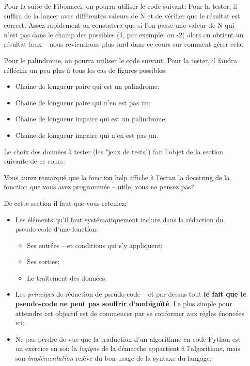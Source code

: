 \documentclass[12pt]{article}
\begin{document}
	\begin{MaReponse}
		Pour la suite de Fibonacci, on pourra utiliser le code suivant:
		Pour la tester, il suffira de la lancer avec différentes valeurs de N et de vérifier que le résultat est correct. Assez rapidement on constatera que si l'on passe une valeur de N qui n'est pas dans le champ des possibles (1, par exemple, ou -2) alors on obtient un résultat faux -- nous reviendrons plus tard dans ce cours sur comment gérer cela.
		\vspace{\baselineskip}
		
		Pour le palindrome, on pourra utiliser le code suivant:
		Pour la tester, il faudra réfléchir un peu plus à tous les cas de figures possibles:
		\begin{itemize}
			\item Chaine de longueur paire qui est un palindrome;
			\item Chaine de longueur paire qui n'en est pas un;
			\item Chaine de longueur impaire qui est un palindrome;
			\item Chaine de longueur impaire qui n'en est pas un.
		\end{itemize}
		
		Le choix des données à tester (les "jeux de tests") fait l'objet de la section suivante de ce cours.
		
		Vous aurez remarqué que la fonction help affiche à l'écran la docstring de la fonction que vous avez programmée -- utile, vous ne pensez pas?
	\end{MaReponse}
	
	\begin{MonRet}
		De cette section il faut que vous reteniez:
		\begin{itemize}
			\item Les éléments qu'il faut systématiquement inclure dans la rédaction du pseudo-code d'une fonction:
			\begin{itemize}
				\item Ses entrées -- et conditions qui s'y appliquent;
				\item Ses sorties;
				\item Le traitement des données.
			\end{itemize}
			\item Les \textit{principes} de rédaction de pseudo-code -- et par-dessus tout \textbf{le fait que le pseudo-code ne peut pas souffrir d'ambiguïté}. Le plus simple pour atteindre cet objectif est de commencer par se conformer aux règles énoncées ici;
			\item Ne pas perdre de vue que la traduction d'un algorithme en code Python est un exercice en soi: la \textit{logique} de la démarche appartient à l'algorithme, mais son \textit{implémentation} relève du bon usage de la syntaxe du langage.
		\end{itemize}
	\end{MonRet}
	
\end{document}
